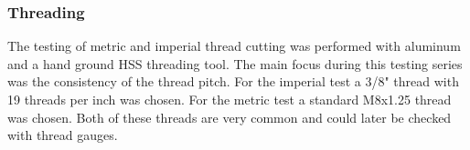 \subsubsection{Threading}
The testing of metric and imperial thread cutting was performed with aluminum and a hand ground HSS threading tool. The main focus during this testing series was the consistency of the thread pitch. For the imperial test a 3/8" thread with 19 threads per inch was chosen. For the metric test a standard M8x1.25 thread was chosen. Both of these threads are very common and could later be checked with thread gauges.












